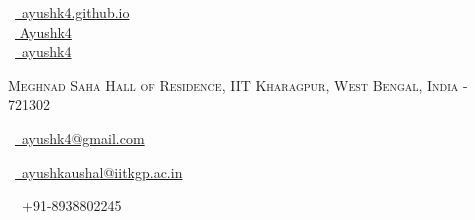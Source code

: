 \documentclass[a4paper,10pt]{extarticle} %
\begin{document}
\pagestyle{empty} %


\begin{multicols}{3}

\normalsize  \faGlobe\ {\href{https://ayushk4.github.io/}{\  ayushk4.github.io}}\\
\normalsize \faGithub\ {\href{https://github.com/Ayushk4}{  Ayushk4}}\\
\normalsize  \faLinkedinSquare\ {\href{https://www.linkedin.com/in/ayushk4}{\  ayushk4}}\\
\columnbreak
\normalsize\par{\centering{\huge\textsc{\textcolor{primary}{Ayush Kaushal}}}\par} %
\par{\centering\normalsize {\textsc{Meghnad Saha Hall of Residence, IIT Kharagpur, West Bengal, India - 721302}}\hfill\par}
\columnbreak
\raggedright\hfill\normalsize \faEnvelope\ {\href{mailto:ayushk4@gmail.com}{\ ayushk4@gmail.com}}\\
\raggedright\hfill\normalsize \faEnvelope\ {\href{mailto:ayushkaushal@iitkgp.ac.in}{\  ayushkaushal@iitkgp.ac.in}}\\

\raggedright\hfill{\faPhone\ \  +91-8938802245}
\end{multicols}

\end{document}
